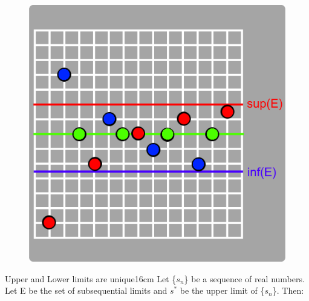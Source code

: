 	\begin{figure}[h]
		\centering
		\includegraphics[scale=0.3]{Images/9.1.2.png}
	\end{figure}



	\begin{wtheorem}{Upper and Lower limits are unique}{16cm}
		Let \{$s_n$\} be a sequence of real numbers.
		Let E be the set of subsequential limits and
		$s^*$ be the upper limit of \{$s_n$\}. Then:
	\end{wtheorem}

